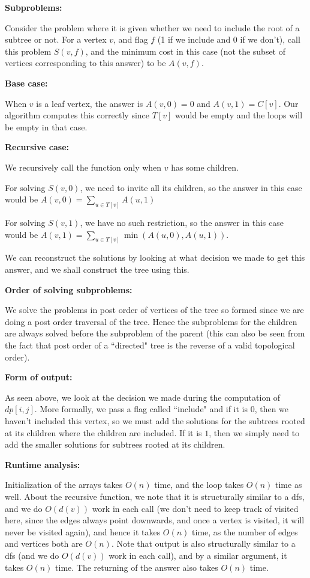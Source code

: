 \documentclass[answers]{exam}
\begin{document}
\begin{questions}
\begin{solution}
    \textbf{Subproblems:}

Consider the problem where it is given whether we need to include the root of a subtree or not. For a vertex $v$, and flag $f$ (1 if we include and 0 if we don't), call this problem $S(v, f)$, and the
    minimum cost in this case (not the subset of vertices corresponding to this answer) to be $A(v, f)$.

    \textbf{Base case:}

When $v$ is a leaf vertex, the answer is $A(v, 0) = 0$ and $A(v, 1) = C[v]$. Our algorithm computes this correctly since $T[v]$ would be empty and the loops will be empty in that case.

    \textbf{Recursive case:}

We recursively call the function only when $v$ has some children.

For solving $S(v, 0)$, we need to invite all its children, so the answer in this case would be $A(v, 0) = \sum_{u \in T[v]} A(u, 1)$

For solving $S(v, 1)$, we have no such restriction, so the answer in this case would be $A(v, 1) = \sum_{u \in T[v]} \min(A(u, 0), A(u, 1))$.

We can reconstruct the solutions by looking at what decision we made to get this answer, and we shall construct the tree using this.

\textbf{Order of solving subproblems:}

We solve the problems in post order of vertices of the tree so formed since we are doing a post order traversal of the tree. Hence the subproblems for the children are always solved before the
subproblem of the parent (this can also be seen from the fact that post order of a ``directed" tree is the reverse of a valid topological order).

\textbf{Form of output:}

As seen above, we look at the decision we made during the computation of $dp[i, j]$. More formally, we pass a flag called ``include" and if it is $0$, then we haven't included this vertex, so we must
add the solutions for the subtrees rooted at its children where the children are included. If it is $1$, then we simply need to add the smaller solutions for subtrees rooted at its children.

\textbf{Runtime analysis:}

Initialization of the arrays takes $O(n)$ time, and the loop takes $O(n)$ time as well. About the recursive function, we note that it is structurally similar to a dfs, and we do $O(d(v))$ work in each
call (we don't need to keep track of visited here, since the edges always point downwards, and once a vertex is visited, it will never be visited again), and hence it takes $O(n)$ time, as the number
of edges and vertices both are $O(n)$. Note that output is also structurally similar to a dfs (and we do $O(d(v))$ work in each call), and by a similar argument, it takes $O(n)$ time. The returning of
the answer also takes $O(n)$ time.


\end{solution}
\end{questions}
\end{document}
